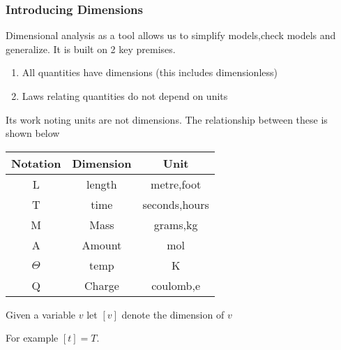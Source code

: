 \documentclass{article}
\begin{document}
\subsubsection{Introducing Dimensions}
Dimensional analysis as a tool allows us to simplify models,check models and generalize. It is built on 2 key premises.
\begin{enumerate}
    \item All quantities have dimensions (this includes dimensionless)
    \item Laws relating quantities do not depend on units
\end{enumerate}
Its work noting units are not dimensions. The relationship between these is shown below
\begin{center}
    \begin{tabular}{|c|c|c|}
         \hline
         Notation&Dimension&Unit  \\
         \hline
         L&length&metre,foot\\
         T&time&seconds,hours\\
         M&Mass&grams,kg\\
         A&Amount&mol\\
         $\Theta$&temp&K\\
         Q&Charge&coulomb,e\\
         \hline
    \end{tabular}
\end{center}
\begin{definition}
    Given a variable $v$ let $[v]$ denote the dimension of $v$    
\end{definition}
For example $[t] = T$.
\end{document}
